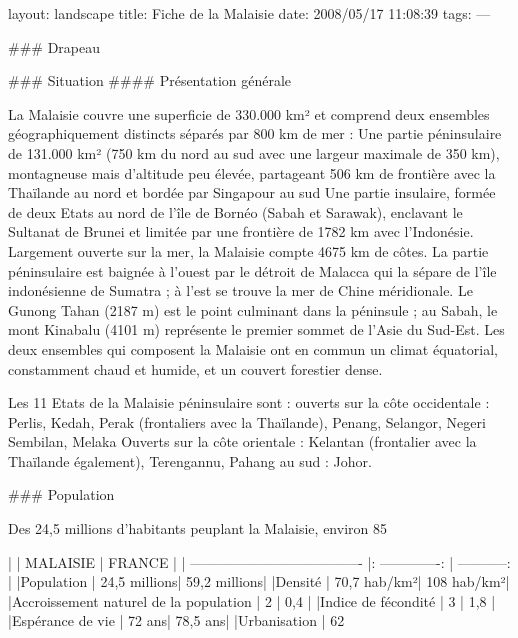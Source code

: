 layout: landscape
title: Fiche de la Malaisie
date: 2008/05/17 11:08:39
tags:
---

### Drapeau

{%

### Situation
#### Présentation générale

La Malaisie couvre une superficie de 330.000 km² et comprend deux ensembles géographiquement distincts séparés par 800 km de mer :  Une partie péninsulaire de 131.000 km² (750 km du nord au sud avec une largeur maximale de 350 km), montagneuse mais d'altitude peu élevée, partageant 506 km de frontière avec la Thaïlande au nord et bordée par Singapour au sud
Une partie insulaire, formée de deux Etats au nord de l'île de Bornéo (Sabah et Sarawak), enclavant le Sultanat de Brunei et limitée par une frontière de 1782 km avec l'Indonésie. Largement ouverte sur la mer, la Malaisie compte 4675 km de côtes. La partie péninsulaire est baignée à l'ouest par le détroit de Malacca qui la sépare de l'île indonésienne de Sumatra ; à l'est se trouve la mer de Chine méridionale. Le Gunong Tahan (2187 m) est le point culminant dans la péninsule ; au Sabah, le mont Kinabalu (4101 m) représente le premier sommet de l'Asie du Sud-Est. Les deux ensembles qui composent la Malaisie ont en commun un climat équatorial, constamment chaud et humide, et un couvert forestier dense.

Les 11 Etats de la Malaisie péninsulaire sont :  ouverts sur la côte occidentale : Perlis, Kedah, Perak (frontaliers avec la Thaïlande), Penang, Selangor, Negeri Sembilan, Melaka Ouverts sur la côte orientale : Kelantan (frontalier avec la Thaïlande également), Terengannu, Pahang au sud : Johor.

### Population

Des 24,5 millions d'habitants peuplant la Malaisie, environ 85%

|                                       |     MALAISIE    |    FRANCE    |
| ------------------------------------- |: -------------: | -----------: |
|Population                             |    24,5 millions| 59,2 millions|
|Densité                                |     70,7 hab/km²|   108 hab/km²|
|Accroissement naturel de la population |               2 |          0,4 |
|Indice de fécondité                    |               3 |          1,8 |
|Espérance de vie                       |           72 ans|      78,5 ans|
|Urbanisation                           |             62 %

}
